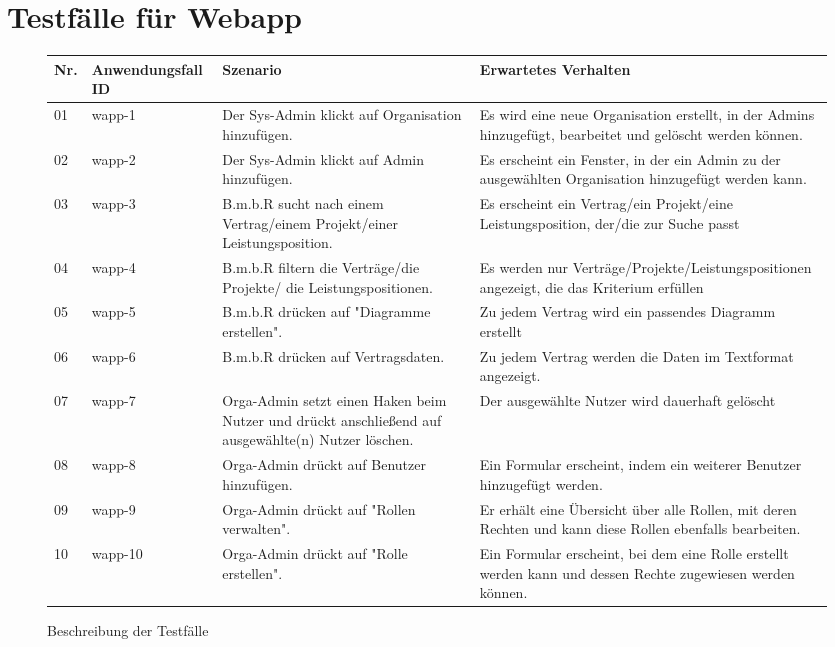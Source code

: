 \section{Testfälle für Webapp}
\begin{figure}[!h]
	\begin{center}
		\begin{tabularx}{\textwidth}{ p{} | p{} | p{} | X }
			\textbf{Nr.} & \textbf{Anwendungsfall ID} & \textbf{Szenario} & \textbf{Erwartetes Verhalten} \\ \hline
			01 & wapp-1 & Der Sys-Admin klickt auf Organisation hinzufügen. & Es wird eine neue Organisation erstellt, in der Admins hinzugefügt, bearbeitet und gelöscht werden können. \\ \hline
			02 & wapp-2 & Der Sys-Admin klickt auf Admin hinzufügen. & Es erscheint ein Fenster, in der ein Admin zu der ausgewählten Organisation hinzugefügt werden kann. \\ \hline
			03 & wapp-3 & B.m.b.R sucht nach einem Vertrag/einem Projekt/einer Leistungsposition. & Es erscheint ein Vertrag/ein Projekt/eine Leistungsposition, der/die zur Suche passt \\ \hline
			04 & wapp-4 & B.m.b.R filtern die Verträge/die Projekte/ die Leistungspositionen. & Es werden nur Verträge/Projekte/Leistungspositionen angezeigt, die das Kriterium erfüllen \\ \hline
			05 & wapp-5 & B.m.b.R drücken auf "Diagramme erstellen". & Zu jedem Vertrag wird ein passendes Diagramm erstellt \\ \hline
			06 & wapp-6 & B.m.b.R drücken auf Vertragsdaten. & Zu jedem Vertrag werden die Daten im Textformat angezeigt. \\ \hline 
			07& wapp-7 & Orga-Admin setzt einen Haken beim Nutzer und drückt anschließend auf ausgewählte(n) Nutzer löschen. & Der ausgewählte Nutzer wird dauerhaft gelöscht \\ \hline
			08 & wapp-8 & Orga-Admin drückt auf Benutzer hinzufügen. & Ein Formular erscheint, indem ein weiterer Benutzer hinzugefügt werden. \\ \hline
			09 & wapp-9 & Orga-Admin drückt auf "Rollen verwalten". & Er erhält eine Übersicht über alle Rollen, mit deren Rechten und kann diese Rollen ebenfalls bearbeiten. \\ \hline
			10 & wapp-10 & Orga-Admin drückt auf "Rolle erstellen". & Ein Formular erscheint, bei dem eine Rolle erstellt werden kann und dessen Rechte zugewiesen werden können. \\ \hline
		\end{tabularx}	
	\end{center}
	\caption{Beschreibung der Testfälle}
	\label{fig:testfaelle-web-app-tabelle}
\end{figure}

